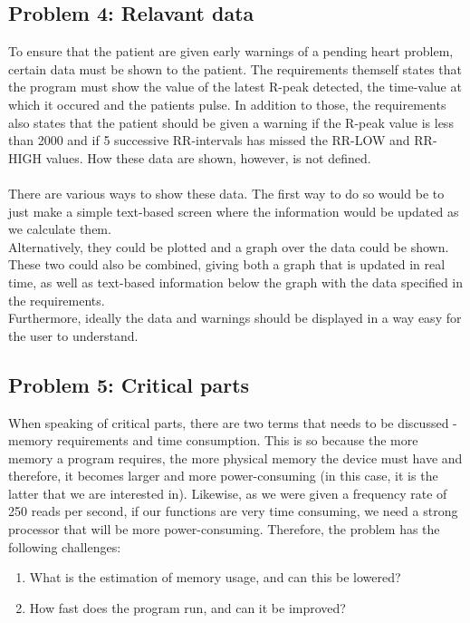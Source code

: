 \documentclass[12pt,a4paper]{article}
\begin{document}
\subsection{Problem 4: Relavant data}
	To ensure that the patient are given early warnings of a pending heart problem, certain data must be shown to the patient. The requirements themself states that the program must show the value of the latest R-peak detected, the time-value at which it occured and the patients pulse. In addition to those, the requirements also states that the patient should be given a warning if the R-peak value is less than 2000 and if 5 successive RR-intervals has missed the RR-LOW and RR-HIGH values. How these data are shown, however, is not defined.\\
\\
There are various ways to show these data. The first way to do so would be to just make a simple text-based screen where the information would be updated as we calculate them.\\
Alternatively, they could be plotted and a graph over the data could be shown.\\
These two could also be combined, giving both a graph that is updated in real time, as well as text-based information below the graph with the data specified in the requirements.\\
Furthermore, ideally the data and warnings should be displayed in a way easy for the user to understand.

\subsection{Problem 5: Critical parts}
When speaking of critical parts, there are two terms that needs to be discussed - memory requirements and time consumption. This is so because the more memory a program requires, the more physical memory the device must have and therefore, it becomes larger and more power-consuming (in this case, it is the latter that we are interested in). Likewise, as we were given a frequency rate of 250 reads per second, if our functions are very time consuming, we need a strong processor that will be more power-consuming. Therefore, the problem has the following challenges:
\begin{enumerate}
\item What is the estimation of memory usage, and can this be lowered?
\item How fast does the program run, and can it be improved?
\end{enumerate}
\end{document}
